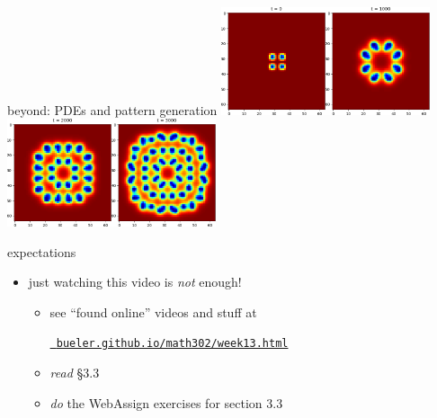 \documentclass[urlcolor=blue,dvipsnames]{beamer}
\begin{document}
\begin{frame}{beyond: PDEs and pattern generation}
\mbox{\includegraphics[width=0.23\textwidth]{figs/pattern0}\quad\includegraphics[width=0.23\textwidth]{figs/pattern2}\quad\includegraphics[width=0.23\textwidth]{figs/pattern4}\quad\includegraphics[width=0.23\textwidth]{figs/pattern6}}

\bigskip
\end{frame}


\begin{frame}{expectations}

\begin{itemize}
\item just watching this video is \emph{not} enough!
     \begin{itemize}
     \item see ``found online'' videos and stuff at

     \centerline{\href{https://bueler.github.io/math302/week13.html}{\tt \color{cyan} bueler.github.io/math302/week13.html}}
     \item \emph{read} \S3.3
     \item \emph{do} the WebAssign exercises for section 3.3
     \end{itemize}
\end{itemize}
\end{frame}
\end{document}
